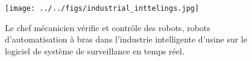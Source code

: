 \begin{figure}[!ht]
    \centering
    \texttt{[image: ../../figs/industrial\_inttelings.jpg]}
    \caption{Le chef mécanicien vérifie et contrôle des robots, robots d'automatisation à bras dans l'industrie intelligente d'usine sur le logiciel de système de surveillance en temps réel.}
    \label{fig:iiot}
\end{figure}
